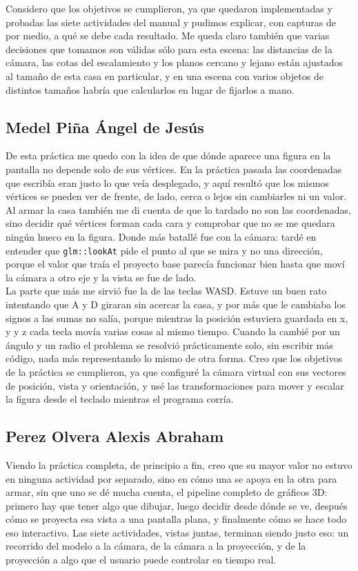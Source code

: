     Considero que los objetivos se cumplieron, ya que quedaron implementadas y probadas las siete actividades del manual y pudimos explicar, con capturas de por medio, a qué se debe cada resultado. Me queda claro también que varias decisiones que tomamos son válidas sólo para esta escena: las distancias de la cámara, las cotas del escalamiento y los planos cercano y lejano están ajustados al tamaño de esta casa en particular, y en una escena con varios objetos de distintos tamaños habría que calcularlos en lugar de fijarlos a mano.\\

    \subsection{Medel Piña Ángel de Jesús}

    De esta práctica me quedo con la idea de que dónde aparece una figura en la pantalla no depende solo de sus vértices. En la práctica pasada las coordenadas que escribía eran justo lo que veía desplegado, y aquí resultó que los mismos vértices se pueden ver de frente, de lado, cerca o lejos sin cambiarles ni un valor. Al armar la casa también me di cuenta de que lo tardado no son las coordenadas, sino decidir qué vértices forman cada cara y comprobar que no se me quedara ningún hueco en la figura. Donde más batallé fue con la cámara: tardé en entender que \texttt{glm::lookAt} pide el punto al que se mira y no una dirección, porque el valor que traía el proyecto base parecía funcionar bien hasta que moví la cámara a otro eje y la vista se fue de lado.\\

    La parte que más me sirvió fue la de las teclas WASD. Estuve un buen rato intentando que A y D giraran sin acercar la casa, y por más que le cambiaba los signos a las sumas no salía, porque mientras la posición estuviera guardada en x, y y z cada tecla movía varias cosas al mismo tiempo. Cuando la cambié por un ángulo y un radio el problema se resolvió prácticamente solo, sin escribir más código, nada más representando lo mismo de otra forma. Creo que los objetivos de la práctica se cumplieron, ya que configuré la cámara virtual con sus vectores de posición, vista y orientación, y usé las transformaciones para mover y escalar la figura desde el teclado mientras el programa corría.\\

    \subsection{Perez Olvera Alexis Abraham}
    Viendo la práctica completa, de principio a fin, creo que su mayor valor no estuvo en ninguna actividad por separado, sino en cómo una se apoya en la otra para armar, sin que uno se dé mucha cuenta, el pipeline completo de gráficos 3D: primero hay que tener algo que dibujar, luego decidir desde dónde se ve, después cómo se proyecta esa vista a una pantalla plana, y finalmente cómo se hace todo eso interactivo. Las siete actividades, vistas juntas, terminan siendo justo eso: un recorrido del modelo a la cámara, de la cámara a la proyección, y de la proyección a algo que el usuario puede controlar en tiempo real.
 
